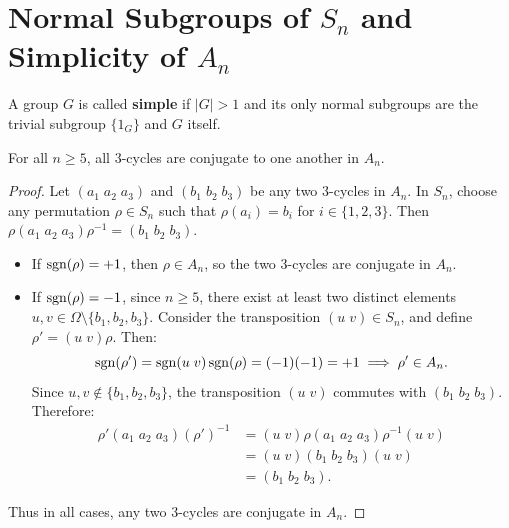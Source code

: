 \section[Normal Subgroups of S\_n and Simplicity of A\_n]{Normal Subgroups of $S_n$ and Simplicity of $A_n$}
\label{sec:simplicity_alternating}

\begin{definition}
A group $G$ is called \textbf{simple} if $|G| > 1$ and its only normal subgroups are the trivial subgroup $\{1_G\}$ and $G$ itself.
\end{definition}

\begin{lemma}
\label{lem:3cycles_conjugate_an}
For all $n \ge 5$, all $3$-cycles are conjugate to one another in $A_n$.
\end{lemma}

\begin{proof}
Let $(a_1 \; a_2 \; a_3)$ and $(b_1 \; b_2 \; b_3)$ be any two 3-cycles in $A_n$.
In $S_n$, choose any permutation $\rho \in S_n$ such that $\rho(a_i) = b_i$ for $i \in \{1, 2, 3\}$.
Then $\rho (a_1 \; a_2 \; a_3) \rho^{-1} = (b_1 \; b_2 \; b_3)$.
\begin{itemize}[leftmargin=1.5em, itemsep=4pt]
    \item If $\operatorname{sgn}(\rho) = +1$, then $\rho \in A_n$, so the two 3-cycles are conjugate in $A_n$.
    \item If $\operatorname{sgn}(\rho) = -1$, since $n \ge 5$, there exist at least two distinct elements $u, v \in \Omega \setminus \{b_1, b_2, b_3\}$.
    Consider the transposition $(u \; v) \in S_n$, and define $\rho' = (u \; v)\rho$.
    Then:
    \begin{equation*}
    \operatorname{sgn}(\rho') = \operatorname{sgn}(u \; v)\operatorname{sgn}(\rho) = (-1)(-1) = +1 \implies \rho' \in A_n.
    \end{equation*}
    Since $u, v \notin \{b_1, b_2, b_3\}$, the transposition $(u \; v)$ commutes with $(b_1 \; b_2 \; b_3)$.
    Therefore:
    \begin{align*}
    \rho' (a_1 \; a_2 \; a_3) (\rho')^{-1} &= (u \; v)\rho (a_1 \; a_2 \; a_3) \rho^{-1}(u \; v) \\
    &= (u \; v)(b_1 \; b_2 \; b_3)(u \; v) \\
    &= (b_1 \; b_2 \; b_3).
    \end{align*}
\end{itemize}
Thus in all cases, any two 3-cycles are conjugate in $A_n$.
\end{proof}


